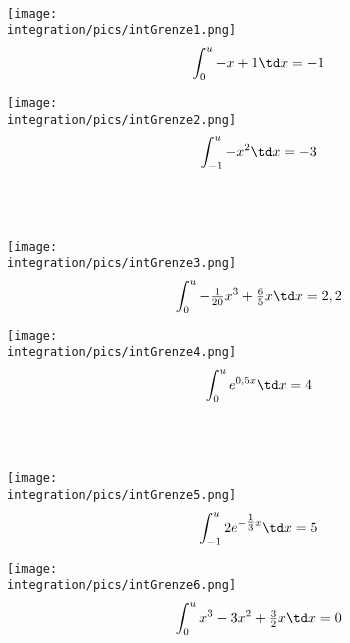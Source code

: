 \begin{Exercise}[title={\raggedright\normalfont Schätze jeweils ein \(u\) graphisch ab und berechne dann die Lösung. Das gesuchte \(u\) soll immer größer als die untere Grenze sein:}, label=intGrenzeA1]\\
	\begin{minipage}{\textwidth}
		\begin{minipage}{.5\textwidth}\raggedright
			\texttt{[image: \\integration/pics/intGrenze1.png]}
			\[\int_0^u-x+1 \td x=-1\]
		\end{minipage}
		\begin{minipage}{.5\textwidth}
			\texttt{[image: \\integration/pics/intGrenze2.png]}
			\[\int_{-1}^u-x^2 \td x=-3\]
		\end{minipage}\vspace{\baselineskip}\\\vspace{\baselineskip}\\
		\begin{minipage}{.5\textwidth}\raggedright
			\texttt{[image: \\integration/pics/intGrenze3.png]}
			\[\int_0^u-\tfrac{1}{20}x^3+\tfrac{6}{5}x \td x=2,2\]
		\end{minipage}
		\begin{minipage}{.5\textwidth}
			\texttt{[image: \\integration/pics/intGrenze4.png]}
			\[\int_0^u e^{0,5x} \td x=4\]
		\end{minipage}\vspace{\baselineskip}\\\vspace{\baselineskip}\\
		\begin{minipage}{.5\textwidth}\raggedright
			\texttt{[image: \\integration/pics/intGrenze5.png]}
			\[\int_{-1}^u 2e^{-\tfrac{1}{3}x} \td x=5\]
		\end{minipage}
		\begin{minipage}{.5\textwidth}
			\texttt{[image: \\integration/pics/intGrenze6.png]}
			\[\int_0^u x^3-3x^2+\tfrac{3}{2}x \td x=0\]
		\end{minipage}
	\end{minipage}
\end{Exercise}

